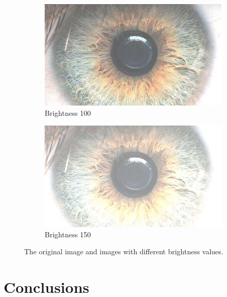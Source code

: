 \documentclass{article}
\begin{document}
\begin{figure}[H]
\begin{subfigure}[b]{0.5\linewidth}
\centering
  \includegraphics[width=0.9\linewidth]{res/bright100.jpg}
  \caption{Brightness 100}
   \label{fig:bright_100}
\end{subfigure}%
\begin{subfigure}[b]{0.5\linewidth}
\centering
  \includegraphics[width=0.9\linewidth]{res/bright150.jpg}
  \caption{Brightness 150}
   \label{fig:bright_150}
\end{subfigure}%



  \caption{The original image and images with different brightness values.}
\vspace{-12pt}
  \label{fig:brightness}
\end{figure}









\section{Conclusions}
\label{sec:conclusions}
\end{document}
